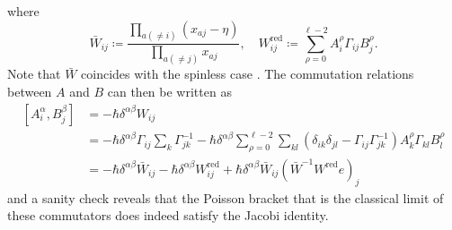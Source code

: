 where
\begin{equation}
\bar W_{ij} \coloneq \frac{\prod_{a(\neq i)} (x_{aj}-\eta)}{\prod_{a(\neq j)} x_{aj}}, \quad W_{ij}^\text{red} \coloneq \sum_{\rho=0}^{\ell-2} A_i^\rho \Gamma_{ij} B_j^\rho.
\end{equation}
Note that $\bar W$ coincides with the spinless case \cite{arutyunov_quantum_1996}. The commutation relations between $A$ and $B$ can then be written as
\begin{equation}\label{eq:commutatorAB}
\begin{aligned}
[A_i^\alpha,B_j^\beta]
&= -\hbar\delta^{\alpha\beta} W_{ij} \\
&= -\hbar\delta^{\alpha\beta} \Gamma_{ij} \sum_k \Gamma_{jk}^{-1} - \hbar\delta^{\alpha\beta} \sum_{\rho=0}^{\ell-2} \sum_{kl} (\delta_{ik} \delta_{jl} - \Gamma_{ij} \Gamma_{jk}^{-1}) A_k^\rho \Gamma_{kl} B_l^\rho \\
&= -\hbar\delta^{\alpha\beta} \bar W_{ij} - \hbar\delta^{\alpha\beta} W_{ij}^\text{red} + \hbar\delta^{\alpha\beta} \bar W_{ij} (\bar W^{-1} W^\text{red} e)_j
\end{aligned}
\end{equation}
and a sanity check reveals that the Poisson bracket that is the classical limit of these commutators does indeed satisfy the Jacobi identity.

